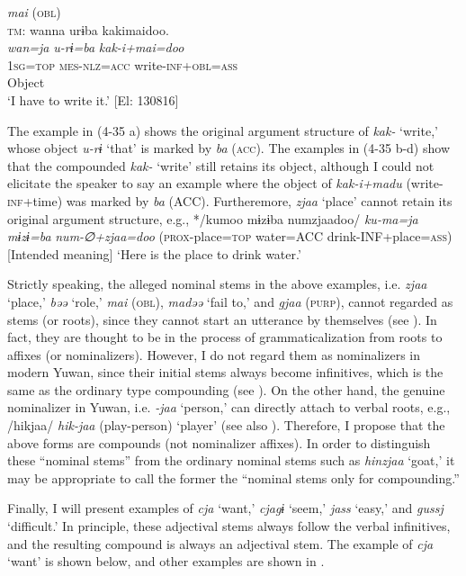 \ex \textit{mai} (\textsc{obl})\\
\gllll  \textsc{tm}:  wanna  urɨba  kakimaidoo.\\
    \textit{wan=ja}  \textit{u-rɨ=ba}  \textit{kak-i+mai=doo}\\
    1\textsc{sg}=\textsc{top}  \textsc{mes}-\textsc{nlz}=\textsc{acc}  write-\textsc{inf}+\textsc{obl}=\textsc{ass}\\
      Object  \\
    \glt     ‘I have to write it.’ [El: 130816]
    \z
\z

The example in (4-35 a) shows the original argument structure of \textit{kak-} ‘write,’ whose object \textit{u-rɨ} ‘that’ is marked by \textit{ba} (\textsc{acc}). The examples in (4-35 b-d) show that the compounded \textit{kak-} ‘write’ still retains its object, although I could not elicitate the speaker to say an example where the object of \textit{kak-i+madu} (write-\textsc{inf}+time) was marked by \textit{ba} (ACC). Furtheremore, \textit{zjaa} ‘place’ cannot retain its original argument structure, e.g., */kumoo mɨzɨba numzjaadoo/ \textit{ku-ma=ja} \textit{mɨzɨ=ba} \textit{num-∅+zjaa=doo} (\textsc{prox}-place=\textsc{top} water=ACC drink-INF+place=\textsc{ass}) [Intended meaning] ‘Here is the place to drink water.’

Strictly speaking, the alleged nominal stems in the above examples, i.e. \textit{zjaa} ‘place,’ \textit{bəə} ‘role,’ \textit{mai} (\textsc{obl}), \textit{madəə} ‘fail to,’ and \textit{gjaa} (\textsc{purp}), cannot regarded as stems (or roots), since they cannot start an utterance by themselves (see ). In fact, they are thought to be in the process of grammaticalization from roots to affixes (or nominalizers). However, I do not regard them as nominalizers in modern Yuwan, since their initial stems always become infinitives, which is the same as the ordinary type compounding (see ). On the other hand, the genuine nominalizer in Yuwan, i.e. \textit{{}-jaa} ‘person,’ can directly attach to verbal roots, e.g., /hikjaa/ \textit{hik-jaa} (play-person) ‘player’ (see also ). Therefore, I propose that the above forms are compounds (not nominalizer affixes). In order to distinguish these “nominal stems” from the ordinary nominal stems such as \textit{hinzjaa} ‘goat,’ it may be appropriate to call the former the “nominal stems only for compounding.”

Finally, I will present examples of \textit{cja} ‘want,’ \textit{cjagɨ} ‘seem,’ \textit{jass} ‘easy,’ and \textit{gussj} ‘difficult.’ In principle, these adjectival stems always follow the verbal infinitives, and the resulting compound is always an adjectival stem. The example of \textit{cja} ‘want’ is shown below, and other examples are shown in .

